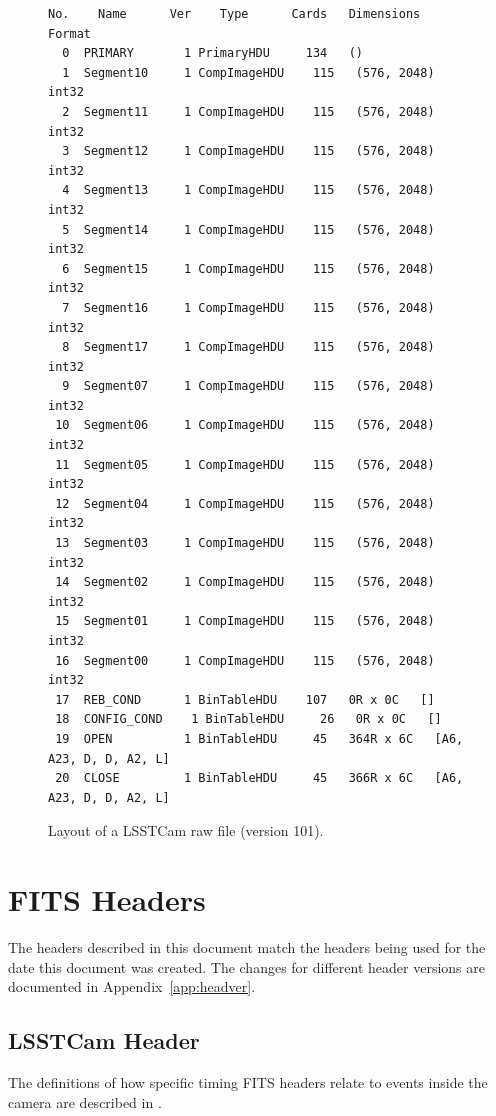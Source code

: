 \documentclass[OPS,lsstdraft,authoryear,toc]{lsstdoc}
\begin{document}
\begin{figure}
  \begin{center}
\begin{verbatim}
No.    Name      Ver    Type      Cards   Dimensions   Format
  0  PRIMARY       1 PrimaryHDU     134   ()
  1  Segment10     1 CompImageHDU    115   (576, 2048)   int32
  2  Segment11     1 CompImageHDU    115   (576, 2048)   int32
  3  Segment12     1 CompImageHDU    115   (576, 2048)   int32
  4  Segment13     1 CompImageHDU    115   (576, 2048)   int32
  5  Segment14     1 CompImageHDU    115   (576, 2048)   int32
  6  Segment15     1 CompImageHDU    115   (576, 2048)   int32
  7  Segment16     1 CompImageHDU    115   (576, 2048)   int32
  8  Segment17     1 CompImageHDU    115   (576, 2048)   int32
  9  Segment07     1 CompImageHDU    115   (576, 2048)   int32
 10  Segment06     1 CompImageHDU    115   (576, 2048)   int32
 11  Segment05     1 CompImageHDU    115   (576, 2048)   int32
 12  Segment04     1 CompImageHDU    115   (576, 2048)   int32
 13  Segment03     1 CompImageHDU    115   (576, 2048)   int32
 14  Segment02     1 CompImageHDU    115   (576, 2048)   int32
 15  Segment01     1 CompImageHDU    115   (576, 2048)   int32
 16  Segment00     1 CompImageHDU    115   (576, 2048)   int32
 17  REB_COND      1 BinTableHDU    107   0R x 0C   []
 18  CONFIG_COND    1 BinTableHDU     26   0R x 0C   []
 19  OPEN          1 BinTableHDU     45   364R x 6C   [A6, A23, D, D, A2, L]
 20  CLOSE         1 BinTableHDU     45   366R x 6C   [A6, A23, D, D, A2, L]
\end{verbatim}
\end{center}
\caption{Layout of a LSSTCam raw file (version 101).}
\label{fig:layout}
\end{figure}

\section{FITS Headers}

The headers described in this document match the headers being used for the date this document was created.
The changes for different header versions are documented in Appendix~\ref{app:headver}.

\subsection{LSSTCam Header}

The definitions of how specific timing FITS headers relate to events inside the camera are described in .
\end{document}

